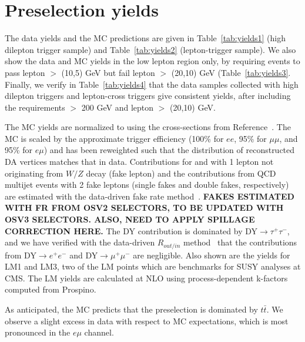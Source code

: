 \section{Preselection yields}
\label{sec:yields}

The data yields and the MC predictions are given in Table~\ref{tab:yields1} (high \pt dilepton
trigger sample) and Table~\ref{tab:yields2} (lepton-\Ht trigger sample). We also show the
data and MC yields in the low \pt lepton region only, by requiring events to pass lepton
\pt $>$ (10,5) GeV but fail lepton \pt $>$ (20,10) GeV (Table~\ref{tab:yields3}.
Finally, we verify in Table~\ref{tab:yields4} that the data samples collected with high \pt dilepton
triggers and lepton-\Ht cross triggers give consistent yields, after including the requirements
\Ht $>$ 200 GeV and lepton \pt $>$ (20,10) GeV.




The MC yields are normalized to \lumi using the cross-sections
from Reference~\cite{ref:xsec}. The MC is scaled by the approximate trigger efficiency (100\% for $ee$,
95\% for $\mu\mu$, and 95\% for $e\mu$) and has been reweighted such that the distribution of 
reconstructed DA vertices matches that in data. Contributions for \ttfake and \wjets  
with 1 lepton not originating from $W/Z$ decay (fake lepton) and the contributions from QCD multijet events 
with 2 fake leptons (single fakes and double fakes, respectively) are estimated with the data-driven
fake rate method~\cite{ref:top}. {\color{red} \bf FAKES ESTIMATED WITH FR FROM OSV2 SELECTORS, TO BE 
UPDATED WITH OSV3 SELECTORS. ALSO, NEED TO APPLY SPILLAGE CORRECTION HERE.}
The DY contribution is dominated by DY$\rightarrow \tau^+\tau^-$,
and we have verified with the data-driven $R_{out/in}$ method~\cite{ref:top} that the
contributions from DY$\to e^{+}e^{-}$ and DY$\to \mu^{+}\mu^{-}$ are negligible.
Also shown are the yields for LM1 and LM3, two of the LM 
points which are benchmarks for SUSY analyses at CMS. The LM yields
are calculated at NLO using process-dependent k-factors computed from Prospino.

As anticipated, the MC predicts that the preselection is dominated by $t\bar{t}$.  
We observe a slight excess in data with respect to MC expectations, which is most pronounced in the $e\mu$ channel.

